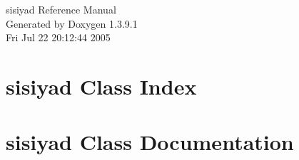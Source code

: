 \documentclass[a4paper]{book}
\begin{document}
\begin{titlepage}
\vspace*{7cm}
\begin{center}
{\Large sisiyad Reference Manual}\\
\vspace*{1cm}
{\large Generated by Doxygen 1.3.9.1}\\
\vspace*{0.5cm}
{\small Fri Jul 22 20:12:44 2005}\\
\end{center}
\end{titlepage}
\clearemptydoublepage
{}
\tableofcontents
\clearemptydoublepage
{}
\chapter{sisiyad Class Index}

\chapter{sisiyad Class Documentation}

\printindex
\end{document}
